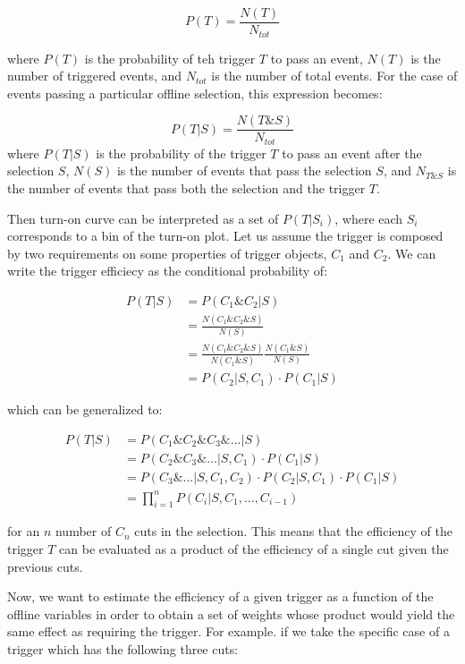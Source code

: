 \begin{equation}
P(T) = \frac{N(T)}{N_{tot}}
\end{equation}

where $P(T)$ is the probability of teh trigger $T$ to pass an event, $N(T)$ is the number of triggered events, and $N_{tot}$ is the number of total events. For the case of events passing a particular offline selection, this expression becomes:

\begin{equation}
P(T|S) = \frac{N(T\&S)}{N_{tot}}
\end{equation}
where $P(T|S)$ is the probability of the trigger $T$ to pass an event after the selection $S$, $N(S)$ is the number of events that pass the selection $S$, and $N_{T\&S}$ is the number of events that pass both the selection and the trigger $T$.

Then turn-on curve can be interpreted as a set of $P(T|S_{i})$, where each $S_{i}$ corresponds to a bin of the turn-on plot. Let us assume the trigger is composed by two requirements on some properties of trigger objects, $C_{1}$ and $C_{2}$. We can write the trigger efficiecy as the conditional probability of:

\begin{align}
P(T|S) &= P(C_{1}\&C_{2}|S)\\
&=\frac{N(C_{1}\&C_{2}\&S)}{N(S)}\\
&=\frac{N(C_{1}\&C_{2}\&S)}{N(C_{1}\&S)} \frac{N(C_{1}\&S)}{N(S)}\\
&=P(C_{2}|S,C_{1})\cdot P(C_{1}|S)
\end{align}

which can be generalized to:

\begin{align}
P(T|S) &= P(C_{1}\&C_{2}\&C_{3}\&...|S)\\
&=P(C_{2}\&C_{3}\&...|S,C_{1})\cdot P(C_{1}|S)\\
&=P(C_{3}\&...|S,C_{1},C_{2})\cdot P(C_{2}|S,C_{1})\cdot P(C_{1}|S)\\	
&=\prod_{i=1}^{n} P(C_{i}|S,C_{1},...,C_{i-1})
\end{align}

for an $n$ number of $C_{n}$ cuts in the selection. This means that the efficiency of the trigger $T$ can be evaluated as a product of the efficiency of a single cut given the previous cuts.

Now, we want to estimate the efficiency of a given trigger as a function of the offline variables in order to obtain a set of weights whose product would yield the same effect as requiring the trigger. For example. if we take the specific case of a trigger which has the following three cuts:

